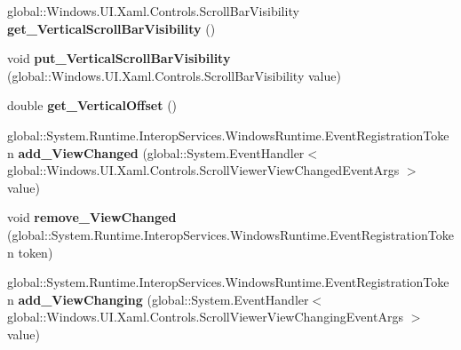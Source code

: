 \begin{DoxyCompactItemize}
global\+::\+Windows.\+U\+I.\+Xaml.\+Controls.\+Scroll\+Bar\+Visibility {\bfseries get\+\_\+\+Vertical\+Scroll\+Bar\+Visibility} ()
\item 
\mbox{\label{class_windows_1_1_u_i_1_1_xaml_1_1_controls_1_1_scroll_viewer_a4ebc42955ec0b6a9d1bb937a99db8d5a}} 
void {\bfseries put\+\_\+\+Vertical\+Scroll\+Bar\+Visibility} (global\+::\+Windows.\+U\+I.\+Xaml.\+Controls.\+Scroll\+Bar\+Visibility value)
\item 
\mbox{\label{class_windows_1_1_u_i_1_1_xaml_1_1_controls_1_1_scroll_viewer_a19208c9fc6f7a5b20ce2809e891eaf0a}} 
double {\bfseries get\+\_\+\+Vertical\+Offset} ()
\item 
\mbox{\label{class_windows_1_1_u_i_1_1_xaml_1_1_controls_1_1_scroll_viewer_ac4976aefef665f53fb870e4ce8813d73}} 
global\+::\+System.\+Runtime.\+Interop\+Services.\+Windows\+Runtime.\+Event\+Registration\+Token {\bfseries add\+\_\+\+View\+Changed} (global\+::\+System.\+Event\+Handler$<$ global\+::\+Windows.\+U\+I.\+Xaml.\+Controls.\+Scroll\+Viewer\+View\+Changed\+Event\+Args $>$ value)
\item 
\mbox{\label{class_windows_1_1_u_i_1_1_xaml_1_1_controls_1_1_scroll_viewer_a317f11553250f27cac32f2a138b5c4b4}} 
void {\bfseries remove\+\_\+\+View\+Changed} (global\+::\+System.\+Runtime.\+Interop\+Services.\+Windows\+Runtime.\+Event\+Registration\+Token token)
\item 
\mbox{\label{class_windows_1_1_u_i_1_1_xaml_1_1_controls_1_1_scroll_viewer_a8696c8cbca169c5458cf7c1bc6e483a9}} 
global\+::\+System.\+Runtime.\+Interop\+Services.\+Windows\+Runtime.\+Event\+Registration\+Token {\bfseries add\+\_\+\+View\+Changing} (global\+::\+System.\+Event\+Handler$<$ global\+::\+Windows.\+U\+I.\+Xaml.\+Controls.\+Scroll\+Viewer\+View\+Changing\+Event\+Args $>$ value)
\item 
\mbox{\label{class_windows_1_1_u_i_1_1_xaml_1_1_controls_1_1_scroll_viewer_a4ab42f006f295d28bd3080f99f149352}} 

\end{DoxyCompactItemize}
